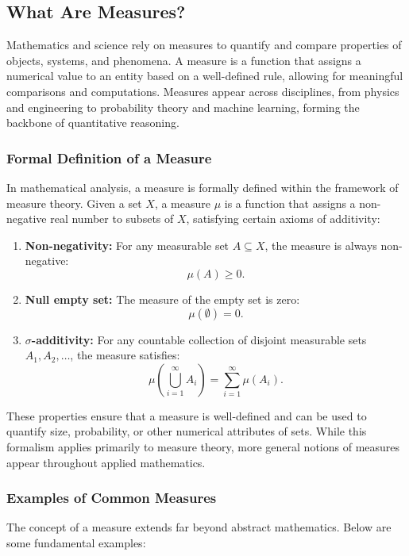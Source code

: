 \subsection{What Are Measures?}

Mathematics and science rely on measures to quantify and compare properties of objects, systems, and phenomena. A measure is a function that assigns a numerical value to an entity based on a well-defined rule, allowing for meaningful comparisons and computations. Measures appear across disciplines, from physics and engineering to probability theory and machine learning, forming the backbone of quantitative reasoning.

\subsubsection{Formal Definition of a Measure}

In mathematical analysis, a measure is formally defined within the framework of measure theory. Given a set \( X \), a measure \( \mu \) is a function that assigns a non-negative real number to subsets of \( X \), satisfying certain axioms of additivity:

\begin{enumerate}
    \item \textbf{Non-negativity:} For any measurable set \( A \subseteq X \), the measure is always non-negative:
    \[
    \mu(A) \geq 0.
    \]
    \item \textbf{Null empty set:} The measure of the empty set is zero:
    \[
    \mu(\emptyset) = 0.
    \]
    \item \textbf{\(\sigma\)-additivity:} For any countable collection of disjoint measurable sets \( A_1, A_2, \dots \), the measure satisfies:
    \[
    \mu\left(\bigcup_{i=1}^{\infty} A_i\right) = \sum_{i=1}^{\infty} \mu(A_i).
    \]
\end{enumerate}

These properties ensure that a measure is well-defined and can be used to quantify size, probability, or other numerical attributes of sets. While this formalism applies primarily to measure theory, more general notions of measures appear throughout applied mathematics.

\subsubsection{Examples of Common Measures}

The concept of a measure extends far beyond abstract mathematics. Below are some fundamental examples:


